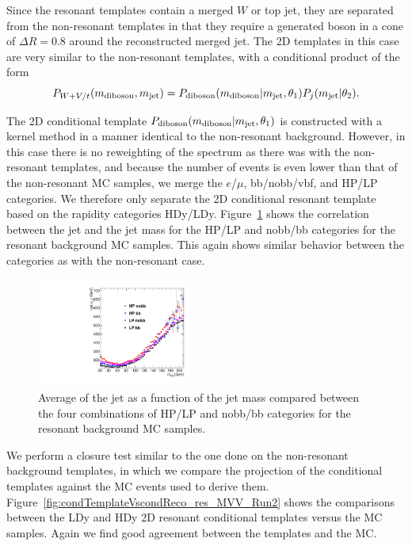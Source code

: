 Since the resonant templates contain a merged $W$ or top jet, they are separated from the non-resonant templates in that they require a generated boson in a cone of $\Delta R=0.8$ around the reconstructed merged jet.
The 2D templates in this case are very similar to the non-resonant templates, with a conditional product of the form
\begin{equation}
  P_{W+V/t}(m_\mathrm{diboson},m_\mathrm{jet})=P_\mathrm{diboson}(m_\mathrm{diboson}|m_\mathrm{jet},\theta_1)P_j(m_\mathrm{jet}|\theta_2).
\end{equation}

The 2D conditional template $P_\mathrm{diboson}(m_\mathrm{diboson}|m_\mathrm{jet},\theta_1)$ is constructed with a kernel method in a manner identical to the non-resonant background.
However, in this case there is no reweighting of the \MVV spectrum as there was with the non-resonant templates, and because the number of events is even lower than that of the non-resonant MC samples, we merge the $e$/$\mu$, bb/nobb/vbf, and HP/LP categories.
We therefore only separate the 2D conditional resonant template based on the rapidity categories HDy/LDy.
Figure~\ref{fig:res2DCorr} shows the correlation between the jet \pt and the jet mass for the HP/LP and nobb/bb categories for the resonant background MC samples.
This again shows similar behavior between the categories as with the non-resonant case.

\begin{figure}[htbp]
  \centering
  \includegraphics[width=0.45\textwidth]{fig/2Dfit/res_corr.pdf}
  \caption{
    Average \pt of the jet as a function of the jet mass \MJ compared between the four combinations of HP/LP and nobb/bb categories for the resonant background MC samples.
  }
  \label{fig:res2DCorr}
\end{figure}

We perform a closure test similar to the one done on the non-resonant background templates, in which we compare the \MVV projection of the conditional templates against the MC events used to derive them.
Figure~\ref{fig:condTemplateVscondReco_res_MVV_Run2} shows the comparisons between the LDy and HDy 2D resonant conditional templates versus the MC samples.
Again we find good agreement between the templates and the MC.


